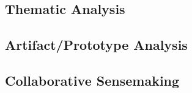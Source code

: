 \subsection{Thematic Analysis}
\subsection{Artifact/Prototype Analysis}
\subsection{Collaborative Sensemaking}
